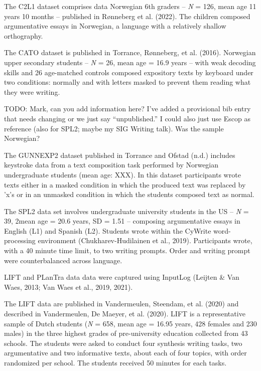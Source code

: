 \documentclass[
  english,
  man,floatsintext]{apa7}
\begin{document}
The C2L1 dataset comprises data Norwegian 6th graders -- \emph{N} = 126, mean age 11 years 10 months -- published in Rønneberg et al. (2022). The children composed argumentative essays in Norwegian, a language with a relatively shallow orthography.

The CATO dataset is published in Torrance, Rønneberg, et al. (2016). Norwegian upper secondary students -- \emph{N} = 26, mean age = 16.9 years -- with weak decoding skills and 26 age-matched controls composed expository texts by keyboard under two conditions: normally and with letters masked to prevent them reading what they were writing.

TODO: Mark, can you add information here? I've added a provisional bib entry that needs changing or we just say \enquote{unpublished.} I could also just use Escop as reference (also for SPL2; maybe my SIG Writing talk). Was the sample Norwegian?

The GUNNEXP2 dataset published in Torrance and Ofstad (n.d.) includes keystroke data from a text composition task performed by Norwegian undergraduate students (mean age: XXX). In this dataset participants wrote texts either in a masked condition in which the produced text was replaced by 'x's or in an unmasked condition in which the students composed text as normal.

The SPL2 data set involves undergraduate university students in the US -- \emph{N} = 39, 2mean age = 20.6 years, SD = 1.51 -- composing argumentative essays in English (L1) and Spanish (L2). Students wrote within the CyWrite word-processing environment (Chukharev-Hudilainen et al., 2019). Participants wrote, with a 40 minute time limit, to two writing prompts. Order and writing prompt were counterbalanced across language.

LIFT and PLanTra data data were captured using InputLog (Leijten \& Van Waes, 2013; Van Waes et al., 2019, 2021).

The LIFT data are published in Vandermeulen, Steendam, et al. (2020) and described in Vandermeulen, De Maeyer, et al. (2020). LIFT is a representative sample of Dutch students (\emph{N} = 658, mean age = 16.95 years, 428 females and 230 males) in the three highest grades of pre-university education collected from 43 schools. The students were asked to conduct four synthesis writing tasks, two argumentative and two informative texts, about each of four topics, with order randomized per school. The students received 50 minutes for each tasks.
\end{document}
